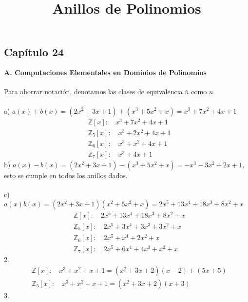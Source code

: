 \documentclass{article}
\begin{document}
\title{\textbf{Anillos de Polinomios}}
\date{}
\maketitle
\subsection*{Capítulo 24}
\textbf{A. Computaciones Elementales en Dominios de Polinomios}
\\
\\
Para ahorrar notación, denotamos las clases de equivalencia $\bar{n}$ como $n$.
\\
\\
a) $a(x)+b(x)=(2x^2 +3x +1)+(x^3 +5x^2 +x)=x^3 + 7x^2 + 4x +1$
\begin{equation*}
\begin{aligned}
    &\mathbb{Z}[x]: \quad x^3 + 7x^2 + 4x +1 \\
    &\mathbb{Z}_5[x]: \quad x^3+2x^2 +4x +1 \\
    &\mathbb{Z}_6[x]: \quad x^3 +x^2 +4x +1 \\
    &\mathbb{Z}_7[x]: \quad x^3 +4x +1
\end{aligned}
\end{equation*}
b) $a(x)-b(x)=(2x^2 +3x +1)-(x^3 +5x^2 +x)=-x^3 -3x^2 +2x +1$, esto se cumple en todos los anillos dados.
\\
\\
c) $a(x)b(x)=(2x^2 +3x +1)(x^2 +5x^2 +x)=2x^5 +13x^4 +18x^3 +8x^2 +x$
\begin{equation*}
\begin{aligned}
    &\mathbb{Z}[x]: \quad 2x^5 +13x^4 +18x^3 +8x^2 +x \\
    &\mathbb{Z}_5[x]: \quad 2x^5 + 3x^4 +3x^3 +3x^2 +x \\
    &\mathbb{Z}_6[x]: \quad 2x^5 + x^4 +2x^2 +x \\
    &\mathbb{Z}_7[x]: \quad 2x^5 + 6x^4 + 4x^3 +x^2 +x
\end{aligned}
\end{equation*}
2. 
\begin{equation*}
\begin{aligned}
    &\mathbb{Z}[x]: \quad x^3 + x^2 +x +1 = (x^2 +3x +2)(x-2)+(5x+5) \\
    &\mathbb{Z}_5[x]: \quad x^3 +x^2 +x +1 = (x^2+3x +2)(x+3)
\end{aligned}
\end{equation*}
3.
\end{document}
